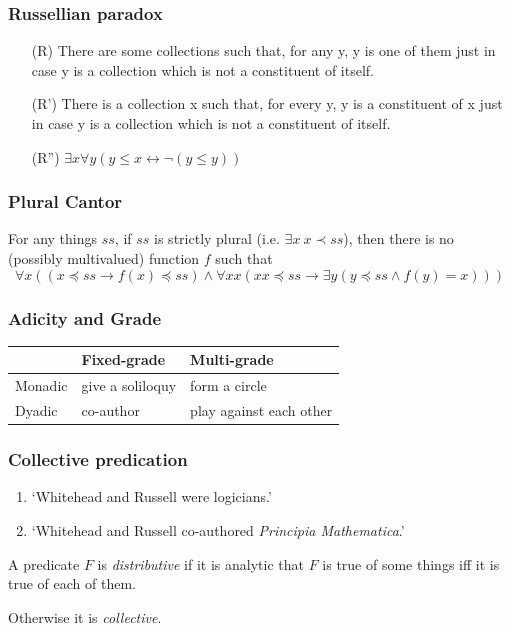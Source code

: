 \documentclass[serif]{beamer}
\renewcommand{\iff}{\leftrightarrow}
\newcommand{\among}{\preccurlyeq}
\begin{document}
\begin{frame}
\frametitle{Russellian paradox}

\begin{enumerate}
  \item[(R)] There are some collections such that, for any y, y is one of them just in case y is a collection which is not a constituent of itself.
  \item[(R')] There is a collection x such that, for every y, y is a constituent of x just in case y is a collection which is not a constituent of itself.
  \item[(R'')] $\exists x \forall y (y \le x \iff \neg (y \le y)) $
\end{enumerate} 

\end{frame}

\begin{frame}
\frametitle{Plural Cantor}
For any things $ss$, if $ss$ is strictly plural (i.e. $\exists x ~ x \prec ss$), then there is no (possibly multivalued) function $f$ such that
\[
  \forall x ((x \among ss \to f(x) \among ss) \land \forall xx (xx \among ss \to \exists y(y\among ss \land f(y) =x)))
\]
\end{frame}

\begin{frame}
\frametitle{Adicity and Grade}

\begin{table}[htdp]
\begin{center}
\begin{tabular}{|l|l|l|}
\hline
& Fixed-grade & Multi-grade\\
\hline
Monadic & give a soliloquy & form a circle \\
Dyadic & co-author & play against each other 
\\
\hline
\end{tabular}
\end{center}
\label{default}
\end{table}%

\end{frame}

\begin{frame}
\frametitle{Collective predication}

\begin{enumerate}[a]
\item `Whitehead and Russell were logicians.'
\item `Whitehead and Russell co-authored \emph{Principia Mathematica}.'
\end{enumerate}

A predicate $F$ is \emph{distributive} if it is analytic that $F$ is true of some things iff it is true of each of them.

Otherwise it is \emph{collective}.
\end{frame}

\setcounter{framenumber}{\value{finalframe}}
\end{document}
